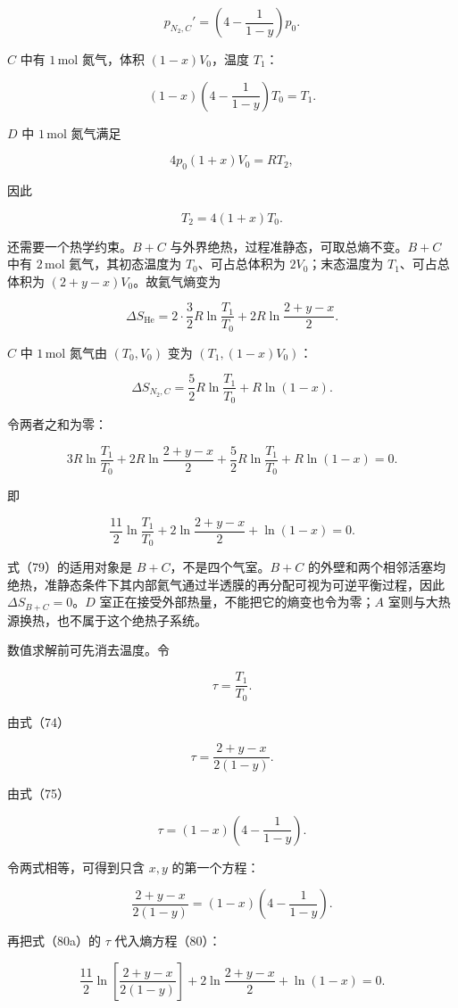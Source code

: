 \documentclass[12pt,a4paper,UTF8]{ctexart}
\begin{document}
\[p_{N_2,C}'=\left(4-\frac1{1-y}\right)p_0.\]

\(C\) 中有 \(1\,\mathrm{mol}\) 氮气，体积 \((1-x)V_0\)，温度 \(T_1\)：

\[\boxed{(1-x)\left(4-\frac1{1-y}\right)T_0=T_1}. \tag{75}\]

\(D\) 中 \(1\,\mathrm{mol}\) 氮气满足

\[4p_0(1+x)V_0=RT_2,\]

因此

\[\boxed{T_2=4(1+x)T_0}. \tag{76}\]

还需要一个热学约束。\(B+C\)
与外界绝热，过程准静态，可取总熵不变。\(B+C\) 中有 \(2\,\mathrm{mol}\)
氦气，其初态温度为 \(T_0\)、可占总体积为 \(2V_0\)；末态温度为
\(T_1\)、可占总体积为 \((2+y-x)V_0\)。故氦气熵变为

\[\Delta S_{\mathrm{He}}
=2\cdot\frac32R\ln\frac{T_1}{T_0}
+2R\ln\frac{2+y-x}{2}. \tag{77}\]

\(C\) 中 \(1\,\mathrm{mol}\) 氮气由 \((T_0,V_0)\) 变为
\((T_1,(1-x)V_0)\)：

\[\Delta S_{N_2,C}
=\frac52R\ln\frac{T_1}{T_0}+R\ln(1-x). \tag{78}\]

令两者之和为零：

\[\boxed{
3R\ln\frac{T_1}{T_0}
+2R\ln\frac{2+y-x}{2}
+\frac52R\ln\frac{T_1}{T_0}
+R\ln(1-x)=0
}. \tag{79}\]

即

\[\frac{11}{2}\ln\frac{T_1}{T_0}
+2\ln\frac{2+y-x}{2}
+\ln(1-x)=0. \tag{80}\]

式（79）的适用对象是 \(B+C\)，不是四个气室。\(B+C\)
的外壁和两个相邻活塞均绝热，准静态条件下其内部氦气通过半透膜的再分配可视为可逆平衡过程，因此
\(\Delta S_{B+C}=0\)。\(D\)
室正在接受外部热量，不能把它的熵变也令为零；\(A\)
室则与大热源换热，也不属于这个绝热子系统。

数值求解前可先消去温度。令

\[\tau=\frac{T_1}{T_0}.\]

由式（74）

\[\tau=\frac{2+y-x}{2(1-y)}. \tag{80a}\]

由式（75）

\[\tau=(1-x)\left(4-\frac1{1-y}\right). \tag{80b}\]

令两式相等，可得到只含 \(x,y\) 的第一个方程：

\[\frac{2+y-x}{2(1-y)}
=(1-x)\left(4-\frac1{1-y}\right). \tag{80c}\]

再把式（80a）的 \(\tau\) 代入熵方程（80）：

\[\frac{11}{2}\ln\left[\frac{2+y-x}{2(1-y)}\right]
+2\ln\frac{2+y-x}{2}+\ln(1-x)=0. \tag{80d}\]
\end{document}
